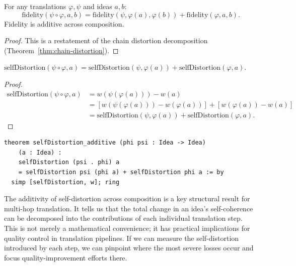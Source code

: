 \begin{theorem}
\label{thm:fidelity-additive}
For any translations $\varphi, \psi$ and ideas $a, b$:
\[
  \mathrm{fidelity}(\psi \circ \varphi, a, b) =
  \mathrm{fidelity}(\psi, \varphi(a), \varphi(b)) +
  \mathrm{fidelity}(\varphi, a, b).
\]
Fidelity is additive across composition.
\end{theorem}

\begin{proof}
This is a restatement of the chain distortion decomposition
(Theorem~\ref{thm:chain-distortion}).
\end{proof}

\begin{theorem}
\label{thm:self-distortion-additive}
$\mathrm{selfDistortion}(\psi \circ \varphi, a) =
 \mathrm{selfDistortion}(\psi, \varphi(a)) +
 \mathrm{selfDistortion}(\varphi, a)$.
\end{theorem}

\begin{proof}
\begin{align*}
  \mathrm{selfDistortion}(\psi \circ \varphi, a)
    &= w(\psi(\varphi(a))) - w(a) \\
    &= [w(\psi(\varphi(a))) - w(\varphi(a))]
       + [w(\varphi(a)) - w(a)] \\
    &= \mathrm{selfDistortion}(\psi, \varphi(a))
       + \mathrm{selfDistortion}(\varphi, a).
\end{align*}
\end{proof}

\begin{lstlisting}
theorem selfDistortion_additive (phi psi : Idea -> Idea)
    (a : Idea) :
    selfDistortion (psi . phi) a
    = selfDistortion psi (phi a) + selfDistortion phi a := by
  simp [selfDistortion, w]; ring
\end{lstlisting}

\begin{interpretation}
\label{int:self-dist-additive}
The additivity of self-distortion across composition is a key structural
result for multi-hop translation.  It tells us that the total change in
an idea's self-coherence can be decomposed into the contributions of
each individual translation step.  This is not merely a mathematical
convenience; it has practical implications for quality control in
translation pipelines.  If we can measure the self-distortion introduced
by each step, we can pinpoint where the most severe losses occur and
focus quality-improvement efforts there.
\end{interpretation}

